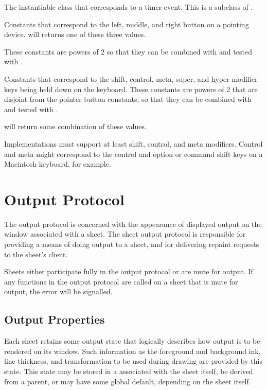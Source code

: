 
The instantiable class that corresponds to a timer event.  This is a subclass
of .



Constants that correspond to the left, middle, and right button on a pointing
device.   will returns one of these three values.

These constants are powers of 2 so that they can be combined with 
and tested with .


Constants that correspond to the shift, control, meta, super, and hyper modifier
keys being held down on the keyboard.  These constants are powers of 2 that are
disjoint from the pointer button constants, so that they can be combined with
 and tested with .

 will return some combination of these values.

Implementations must support at least shift, control, and meta modifiers.
Control and meta might correspond to the control and option or command shift
keys on a Macintosh keyboard, for example.


\section {Output Protocol}

The output protocol is concerned with the appearance of displayed output on the
window associated with a sheet.  The sheet output protocol is responsible for
providing a means of doing output to a sheet, and for delivering repaint
requests to the sheet's client.

Sheets either participate fully in the output protocol or are mute for output.
If any functions in the output protocol are called on a sheet that is mute for
output, the  error will be signalled.


\subsection {Output Properties}

Each sheet retains some output state that logically describes how output is to
be rendered on its window.  Such information as the foreground and background
ink, line thickness, and transformation to be used during drawing are provided
by this state.  This state may be stored in a  associated with
the sheet itself, be derived from a parent, or may have some global default,
depending on the sheet itself.

